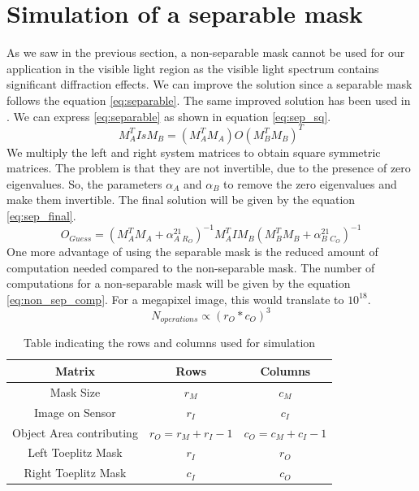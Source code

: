     
\section{Simulation of a separable mask}
As we saw in the previous section, a non-separable mask cannot be used for our application in the visible light region as the visible light spectrum contains significant diffraction effects. We can improve the solution since a separable mask follows the equation \ref{eq:separable}. The same improved solution has been used in \cite{Toeplitz}. We can express \ref{eq:separable} as shown in equation \ref{eq:sep_sq}.
\begin{equation}
M_{A}^TIsM_{B} = (M_{A}^TM_{A})O(M_{B}^TM_B)^T 
\label{eq:sep_sq}
\end{equation} 
We multiply the left and right system matrices to obtain square symmetric matrices. The problem is that they are not invertible, due to the presence of zero eigenvalues. So, the parameters $\alpha_A$ and $\alpha_B$ to remove the zero eigenvalues and make them invertible. The final solution will be given by the equation \ref{eq:sep_final}.
\begin{equation}
O_{Guess} = (M_{A}^TM_A + \alpha_{A}^21_{R_{O}})^{-1}M_{A}^TIM_{B}(M_{B}^TM_B + \alpha_{B}^21_{C_{O}})^{-1}
\label{eq:sep_final}
\end{equation}
One more advantage of using the separable mask is the reduced amount of computation needed compared to the non-separable mask. The number of computations for a non-separable mask will be given by the equation \ref{eq:non_sep_comp}. For a megapixel image, this would translate to $10^{18}$.
\begin{equation}
N_{operations} \propto (r_O*c_O)^3
\label{eq:non_sep_comp}
\end{equation}

\begin{table}[ht]
\caption{Table indicating the rows and columns used for simulation}
\label{tbl:comp_sep}
\begin{center}
\begin{tabular}{ |c|c|c| }
\hline
Matrix & Rows & Columns \\
\hline
Mask Size & $r_M$ & $c_M$\\
\hline
Image on Sensor & $r_I$ & $c_I$\\
\hline
Object Area contributing &  $r_O = r_M + r_I - 1$ & $c_O = c_M + c_I - 1$\\
\hline
Left Toeplitz Mask & $r_{I}$ & $r_{O}$\\
\hline
Right Toeplitz Mask & $c_{I}$ & $c_{O}$\\
\hline
\end{tabular}
\end{center}
\end{table}


